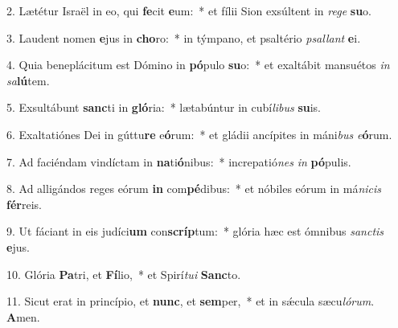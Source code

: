 2. Lætétur Israël in eo, qui \textbf{fe}cit \textbf{e}um:~*  et fílii Sion exsúltent in \textit{re}\textit{ge} \textbf{su}o.\

3. Laudent nomen \textbf{e}jus in \textbf{cho}ro:~*  in týmpano, et psaltério \textit{psal}\textit{lant} \textbf{e}i.\

4. Quia beneplácitum est Dómino in \textbf{pó}pulo \textbf{su}o:~*  et exaltábit mansuétos \textit{in} \textit{sa}\textbf{lú}tem.\

5. Exsultábunt \textbf{sanc}ti in \textbf{gló}ria:~*  lætabúntur in cubí\textit{li}\textit{bus} \textbf{su}is.\

6. Exaltatiónes Dei in gúttu\textbf{re} e\textbf{ó}rum:~*  et gládii ancípites in máni\textit{bus} \textit{e}\textbf{ó}rum.\

7. Ad faciéndam vindíctam in \textbf{na}ti\textbf{ó}nibus:~*  increpatió\textit{nes} \textit{in} \textbf{pó}pulis.\

8. Ad alligándos reges eórum \textbf{in} com\textbf{pé}dibus:~*  et nóbiles eórum in má\textit{ni}\textit{cis} \textbf{fér}reis.\

9. Ut fáciant in eis judíci\textbf{um} con\textbf{scríp}tum:~*  glória hæc est ómnibus \textit{sanc}\textit{tis} \textbf{e}jus.\

10. Glória \textbf{Pa}tri, et \textbf{Fí}lio,~*  et Spirí\textit{tu}\textit{i} \textbf{Sanc}to.\

11. Sicut erat in princípio, et \textbf{nunc}, et \textbf{sem}per,~*  et in sǽcula sæcu\textit{ló}\textit{rum}. \textbf{A}men.\


